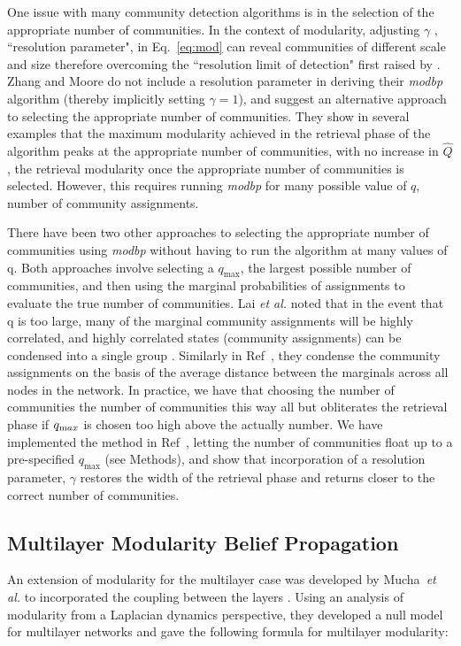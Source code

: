 \documentclass[11pt]{article}
\begin{document}
One issue with many community detection algorithms is in the selection of the appropriate number of communities.  In the context of modularity, adjusting $\gamma$ , ``resolution parameter", in Eq.~\ref{eq:mod} can reveal communities of different scale and size therefore overcoming the ``resolution limit of detection" first raised by \cite{Fortunato:2007js}.  Zhang and Moore do not include a resolution parameter in deriving their \textit{modbp} algorithm (thereby implicitly setting $\gamma=1$), and suggest an alternative approach to selecting the appropriate number of communities.  They show in several examples that the maximum modularity achieved in the retrieval phase of the algorithm peaks at the appropriate number of communities, with no increase in $\hat{Q}$, the retrieval modularity once the appropriate number of communities is selected.  However, this requires running \textit{modbp} for many possible value of $q$, number of community assignments.  

There have been two other approaches to selecting the appropriate number of communities using \textit{modbp} without having to run the algorithm at many values of q.  Both approaches involve selecting a $q_{\text{max}}$, the largest possible number of communities, and then using the marginal probabilities of assignments to evaluate the true number of communities.  Lai \textit{et al.} noted that in the event that q is too large, many of the marginal community assignments will be highly correlated, and highly correlated states (community assignments) can be condensed into a single group \cite{Lai:2016el}.  Similarly in Ref~\cite{Schulke:2015hq}, they condense the community assignments on the basis of the average distance between the marginals across all nodes in the network.  In practice, we have that choosing the number of communities the number of communities this way all but obliterates the retrieval phase if $q_{\text max}$ is chosen too high above the actually number.  We have implemented the method in Ref~\cite{Schulke:2015hq}, letting the number of communities float up to a pre-specified $q_{\text{max}}$ (see Methods), and show that incorporation of a resolution parameter, $\gamma$ restores the width of the retrieval phase and returns closer to the correct number of communities.  

\subsection{Multilayer Modularity Belief Propagation}
An extension of modularity for the multilayer case was developed by Mucha~\textit{et al.} to incorporated the coupling between the layers \cite{Mucha:2010vk}.  Using an analysis of modularity from a Laplacian dynamics perspective, they developed a null model for multilayer networks and gave the following formula for multilayer modularity: 
\end{document}

